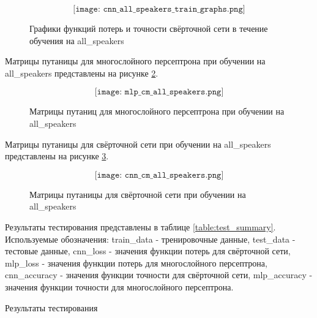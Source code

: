 \begin{figure}[H]
	\[\texttt{[image: cnn\_all\_speakers\_train\_graphs.png]}\]
	\caption{Графики функций потерь и точности свёрточной сети в течение обучения на all\_speakers}
	\label{fig:cnn_all_speakers_train_graphs}
\end{figure}

\newpage
Матрицы путаницы для многослойного персептрона при обучении на all\_speakers представлены на рисунке \ref{fig:mlp_cm_all_speakers}.

\begin{figure}[H]
	\[\texttt{[image: mlp\_cm\_all\_speakers.png]}\]
	\caption{Матрицы путаниц для многослойного персептрона при обучении на all\_speakers}
	\label{fig:mlp_cm_all_speakers}
\end{figure}

\newpage
Матрицы путаницы для свёрточной сети при обучении на all\_speakers представлены на рисунке \ref{fig:cnn_cm_all_speakers}.

\begin{figure}[H]
	\[\texttt{[image: cnn\_cm\_all\_speakers.png]}\]
	\caption{Матрицы путаницы для свёрточной сети при обучении на all\_speakers}
	\label{fig:cnn_cm_all_speakers}
\end{figure}

\newpage
Результаты тестирования представлены в таблице \ref{table:test_summary}. Используемые обозначения: train\_data - тренировочные данные, test\_data - тестовые данные, cnn\_loss - значения функции потерь для свёрточной сети, mlp\_loss - значения функции потерь для многослойного персептрона, cnn\_accuracy - значения функции точности для свёрточной сети, mlp\_accuracy - значения функции точности для многослойного персептрона.

\begin{table}[H]
\small
\centering
{}
\caption{Результаты тестирования}
\label{table:test_summary}
\end{table}
